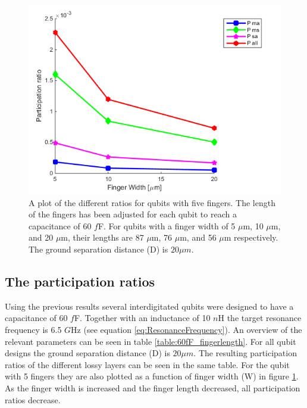  \begin{figure}
 	\centering
 	\includegraphics[scale = 0.7]{Figures/Ratio_plots/FingerWidth_legend}
 	\caption{A plot of the different ratios for qubits with five fingers. The length of the fingers has been adjusted for each qubit to reach a capacitance of 60 \(f\)F. For qubits with a finger width of  5 \(\mu\)m, 10 \(\mu\)m, and 20 \(\mu\)m, their lengths are 87 \(\mu\)m, 76 \(\mu\)m, and 56 \(\mu\)m  respectively. The ground separation distance (D) is \(20\mu m\).}
 	\label{fig:FingerWidth_legend}
 \end{figure}

\subsection{The participation ratios}
Using the previous results several interdigitated qubits were designed to have a capacitance of 60 \(f\)F. Together with an inductance of 10 \(n\)H the target resonance frequency is 6.5 \(G\)Hz (see equation \eqref{eq:ResonanceFrequency}). An overview of the relevant parameters can be seen in table \ref{table:60fF_fingerlength}. For all qubit designs the ground separation distance (D) is \(20 \mu m\). The resulting participation ratios of the different lossy layers can be seen in the same table. For the qubit with 5 fingers they are also plotted as a function of finger width (W) in figure \ref{fig:FingerWidth_legend}. As the finger width is increased and the finger length decreased, all participation ratios decrease.

